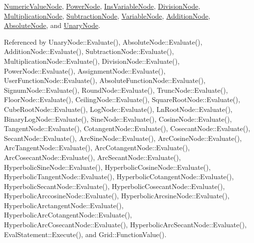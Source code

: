 \hyperlink{classNumericValueNode_abdd2e6fd1723488a24a645fec481a971}{Numeric\+Value\+Node}, \hyperlink{classPowerNode_aa4cabda6c36a848f86b9af2baca6dcc6}{Power\+Node}, \hyperlink{classInsVariableNode_aad01cefd8321d0a6ddaf0d4ef5e62ddf}{Ins\+Variable\+Node}, \hyperlink{classDivisionNode_aacd5e91fefdd7b6147c4ad02e951130e}{Division\+Node}, \hyperlink{classMultiplicationNode_a6f8b2f1b4a4779fd99acc6cef50545cc}{Multiplication\+Node}, \hyperlink{classSubtractionNode_a6ab885bb5ab826b5d0c70a63e753f5e3}{Subtraction\+Node}, \hyperlink{classVariableNode_a7ebbe9072eb78b5790befed3a42b2dc2}{Variable\+Node}, \hyperlink{classAdditionNode_a670d80d50ea6f8d1e38855de7130a503}{Addition\+Node}, \hyperlink{classAbsoluteNode_a35e012fdac8bff4c5252021254f07cbe}{Absolute\+Node}, and \hyperlink{classUnaryNode_af78161ffb449b18c406c46defe6fa9b3}{Unary\+Node}.



Referenced by Unary\+Node\+::\+Evaluate(), Absolute\+Node\+::\+Evaluate(), Addition\+Node\+::\+Evaluate(), Subtraction\+Node\+::\+Evaluate(), Multiplication\+Node\+::\+Evaluate(), Division\+Node\+::\+Evaluate(), Power\+Node\+::\+Evaluate(), Assignment\+Node\+::\+Evaluate(), User\+Function\+Node\+::\+Evaluate(), Absolute\+Function\+Node\+::\+Evaluate(), Signum\+Node\+::\+Evaluate(), Round\+Node\+::\+Evaluate(), Trunc\+Node\+::\+Evaluate(), Floor\+Node\+::\+Evaluate(), Ceiling\+Node\+::\+Evaluate(), Square\+Root\+Node\+::\+Evaluate(), Cube\+Root\+Node\+::\+Evaluate(), Log\+Node\+::\+Evaluate(), Ln\+Root\+Node\+::\+Evaluate(), Binary\+Log\+Node\+::\+Evaluate(), Sine\+Node\+::\+Evaluate(), Cosine\+Node\+::\+Evaluate(), Tangent\+Node\+::\+Evaluate(), Cotangent\+Node\+::\+Evaluate(), Cosecant\+Node\+::\+Evaluate(), Secant\+Node\+::\+Evaluate(), Arc\+Sine\+Node\+::\+Evaluate(), Arc\+Cosine\+Node\+::\+Evaluate(), Arc\+Tangent\+Node\+::\+Evaluate(), Arc\+Cotangent\+Node\+::\+Evaluate(), Arc\+Cosecant\+Node\+::\+Evaluate(), Arc\+Secant\+Node\+::\+Evaluate(), Hyperbolic\+Sine\+Node\+::\+Evaluate(), Hyperbolic\+Cosine\+Node\+::\+Evaluate(), Hyperbolic\+Tangent\+Node\+::\+Evaluate(), Hyperbolic\+Cotangent\+Node\+::\+Evaluate(), Hyperbolic\+Secant\+Node\+::\+Evaluate(), Hyperbolic\+Cosecant\+Node\+::\+Evaluate(), Hyperbolic\+Arccosine\+Node\+::\+Evaluate(), Hyperbolic\+Arcsine\+Node\+::\+Evaluate(), Hyperbolic\+Arctangent\+Node\+::\+Evaluate(), Hyperbolic\+Arc\+Cotangent\+Node\+::\+Evaluate(), Hyperbolic\+Arc\+Cosecant\+Node\+::\+Evaluate(), Hyperbolic\+Arc\+Secant\+Node\+::\+Evaluate(), Eval\+Statement\+::\+Execute(), and Grid\+::\+Function\+Value().



